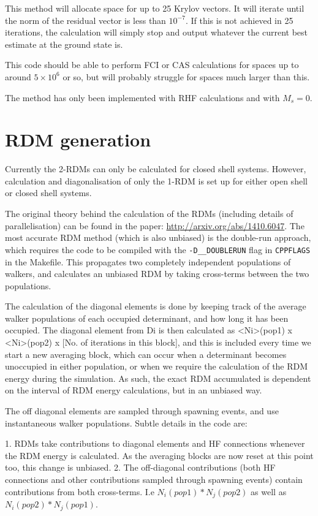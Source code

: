 \documentclass[a4paper,notitlepage,dvipsnames]{scrreprt}
\let\code\lstinline
\begin{document}
    This method will allocate space for up to 25 Krylov vectors. It will iterate
    until the norm of the residual vector is less than $10^{-7}$. If this is
    not achieved in 25 iterations, the calculation will simply stop and output
    whatever the current best estimate at the ground state is.

    This code should be able to perform FCI or CAS calculations for spaces up
    to around $5\times10^6$ or so, but will probably struggle for spaces much
    larger than this.

    The method has only been implemented with RHF calculations and with $M_s=0$.

\section{RDM generation}
\label{sec:rdms}
Currently the 2-RDMs can only be calculated for closed shell systems.  However, calculation and
diagonalisation of only the 1-RDM is set up for either open shell or closed shell systems.

The original theory behind the calculation of the RDMs (including details of parallelisation) can be found in the paper:
\url{http://arxiv.org/abs/1410.6047}. The most accurate RDM method (which is also unbiased) is the double-run approach, which requires
the code to be compiled with the \code{-D__DOUBLERUN} flag in \code{CPPFLAGS} in the Makefile. This propagates
two completely independent populations of walkers, and calculates an unbiased RDM by taking cross-terms
between the two populations.

The calculation of the diagonal elements is done by keeping track of the average walker populations of each
occupied determinant, and how long it has been occupied.  The diagonal element from Di is then calculated
as <Ni>(pop1) x <Ni>(pop2) x [No. of iterations in this block], and this is included every time we start a new
averaging block, which can occur when a determinant becomes unoccupied in either population, or when we require
the calculation of the RDM energy during the simulation. As such, the exact RDM accumulated is dependent on
the interval of RDM energy calculations, but in an unbiased way.

The off diagonal elements are sampled through spawning events, and use instantaneous walker populations.
Subtle details in the code are:

1. RDMs take contributions to diagonal elements and HF connections whenever the RDM energy is calculated.
   As the averaging blocks are now reset at this point too, this change is unbiased.
2. The off-diagonal contributions (both HF connections and other contributions sampled through spawning
   events) contain contributions from both cross-terms. I.e $N_i(pop1)*N_j(pop2)$ as well as
   $N_i(pop2)*N_j(pop1)$.
\end{document}
